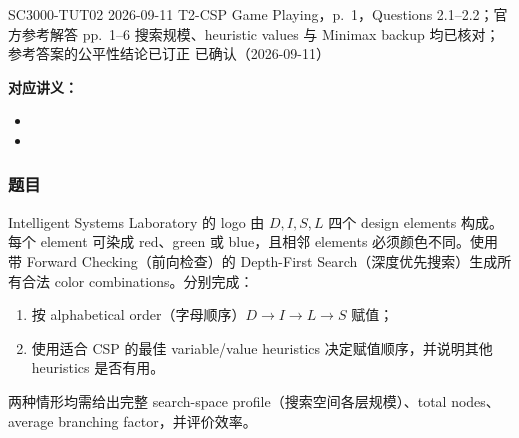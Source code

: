 
\label{tutorial:SC3000-TUT02}

\tutorialmeta
  {SC3000-TUT02}
  {2026-09-11}
  {T2-CSP Game Playing，p.~1，Questions 2.1--2.2；官方参考解答 pp.~1--6}
  {搜索规模、heuristic values 与 Minimax backup 均已核对；参考答案的公平性结论已订正}
  {已确认（2026-09-11）}


\textbf{对应讲义：}
\begin{itemize}
  \item {}
  \item {}
\end{itemize}

\subsubsection*{题目}

Intelligent Systems Laboratory 的 logo 由 $D,I,S,L$ 四个 design elements 构成。每个 element 可染成 red、green 或 blue，且相邻 elements 必须颜色不同。使用带 Forward Checking（前向检查）的 Depth-First Search（深度优先搜索）生成所有合法 color combinations。分别完成：

\begin{enumerate}[label=(\alph*)]
  \item 按 alphabetical order（字母顺序）$D\to I\to L\to S$ 赋值；
  \item 使用适合 CSP 的最佳 variable/value heuristics 决定赋值顺序，并说明其他 heuristics 是否有用。
\end{enumerate}

两种情形均需给出完整 search-space profile（搜索空间各层规模）、total nodes、average branching factor，并评价效率。

